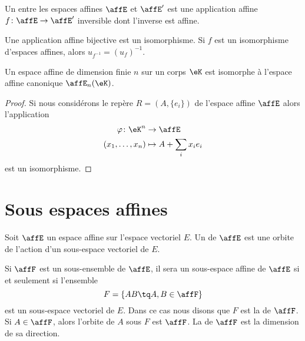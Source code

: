 \begin{definition}
	Un  entre les espaces affines \( \affE\) et \( \affE'\) est une application affine \( f\colon \affE\to \affE'\) inversible dont l'inverse est affine.
\end{definition}

\begin{proposition} \label{PropxtFeDE}
	Une application affine bijective est un isomorphisme. Si \( f\) est un isomorphisme d'espaces affines, alors \( u_{f^{-1}}=(u_f)^{-1}\).
\end{proposition}

\begin{proposition}
	Un espace affine de dimension finie \( n\) sur un corps \( \eK\) est isomorphe à l'espace affine canonique \( \affE_n(\eK)\).
\end{proposition}

\begin{proof}
	Si nous considérons le repère \( R=(A,\{ e_i \})\) de l'espace affine \( \affE\) alors l'application
	\begin{equation}
		\begin{aligned}
			\varphi\colon \eK^n & \to \affE              \\
			(x_1,\ldots,x_n)    & \mapsto A+\sum_ix_ie_i
		\end{aligned}
	\end{equation}
	est un isomorphisme.
\end{proof}

\section{Sous espaces affines}

\begin{definition}      \label{DEFooJSUHooJjtpwz}
	Soit \( \affE\) un espace affine sur l'espace vectoriel \( E\). Un  de \( \affE\) est une orbite de l'action d'un sous-espace vectoriel de \( E\).
\end{definition}

Si \( \affF\) est un sous-ensemble de \( \affE\), il sera un sous-espace affine de \( \affE\) si et seulement si l'ensemble
\begin{equation}
	F=\{ AB\tq A,B\in\affF \}
\end{equation}
est un sous-espace vectoriel de \( E\). Dans ce cas nous disons que \( F\) est la  de \( \affF\). Si \( A\in\affF\), alors l'orbite de \( A\) sous \( F\) est \( \affF\). La  de \( \affF\) est la dimension de sa direction.


